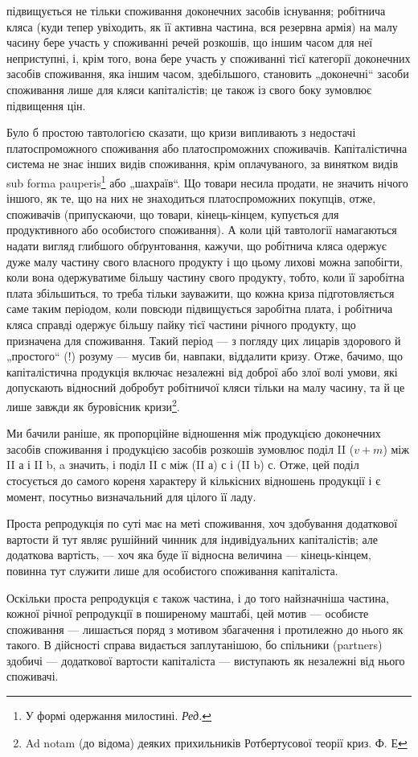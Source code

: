 \parcont{}  %
підвищується не тільки споживання доконечних засобів існування; робітнича
кляса (куди тепер увіходить, як її активна частина, вся резервна
армія) на малу часину бере участь у споживанні речей розкошів, що іншим
часом для неї неприступні, і, крім того, вона бере участь у споживанні
тієї категорії доконечних засобів споживання, яка іншим часом, здебільшого,
становить „доконечні“ засоби споживання лише для кляси капіталістів;
це також із свого боку зумовлює підвищення цін.

Було б простою тавтологією сказати, що кризи випливають з недостачі
платоспроможного споживання або платоспроможних споживачів.
Капіталістична система не знає інших видів споживання, крім оплачуваного,
за винятком видів sub forma pauperis\footnote*{
У формі одержання милостині. \emph{Ред.}
} або „шахраїв“. Що
товари несила продати, не значить нічого іншого, як те, що на них не
знаходиться платоспроможних покупців, отже, споживачів (припускаючи,
що товари, кінець-кінцем, купується для продуктивного або особистого
споживання). А коли цій тавтології намагаються надати вигляд
глибшого обґрунтовання, кажучи, що робітнича кляса одержує дуже малу
частину свого власного продукту і що цьому лихові можна запобігти,
коли вона одержуватиме більшу частину свого продукту, тобто, коли її
заробітна плата збільшиться, то треба тільки зауважити, що кожна криза
підготовляється саме таким періодом, коли повсюди підвищується заробітна
плата, і робітнича кляса справді одержує більшу пайку тієї частини
річного продукту, що призначена для споживання. Такий період — з погляду
цих лицарів здорового й „простого“ (!) розуму — мусив би, навпаки,
віддалити кризу. Отже, бачимо, що капіталістична продукція включає
незалежні від доброї або злої волі умови, які допускають відносний
добробут робітничої кляси тільки на малу часину, та й це лише завжди
як буровісник кризи\footnote{
Ad notam (до відома) деяких прихильників Ротбертусової теорії криз. Ф. Е
}.

Ми бачили раніше, як пропорційне відношення між продукцією
доконечних засобів споживання і продукцією засобів розкошів зумовлює
поділ II ($v + m$) між II а і II b, a значить, і поділ II с між (II а) с і (II b) с.
Отже, цей поділ стосується до самого кореня характеру й кількісних відношень
продукції і є момент, посутньо визначальний для цілого її ладу.

Проста репродукція по суті має на меті споживання, хоч здобування
додаткової вартости й тут являє рушійний чинник для індивідуальних
капіталістів; але додаткова вартість, — хоч яка буде її відносна величина —
кінець-кінцем, повинна тут служити лише для особистого споживання
капіталіста.

Оскільки проста репродукція є також частина, і до того найзначніша
частина, кожної річної репродукції в поширеному маштабі, цей мотив —
особисте споживання — лишається поряд з мотивом збагачення і протилежно
до нього як такого. В дійсності справа видається заплутанішою,
бо спільники (partners) здобичі — додаткової вартости капіталіста — виступають
як незалежні від нього споживачі.
